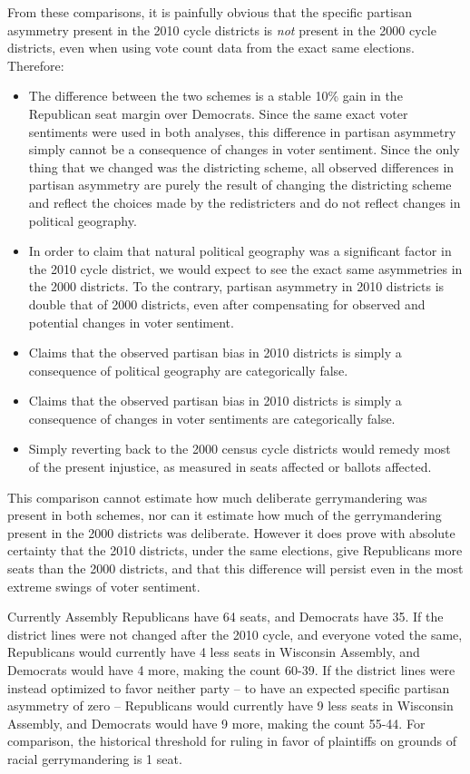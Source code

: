 \documentclass[preprint,12pt]{article}
\begin{document}
From these comparisons, it is painfully obvious that the specific partisan asymmetry present in the 2010 cycle districts is \emph{not} present in the 2000 cycle districts, even when using vote count data from the exact same elections.  Therefore:
\begin{itemize}

\item The difference between the two schemes is a stable 10\% gain in the Republican seat margin over Democrats.
Since the same exact voter sentiments were used in both analyses, this difference in partisan asymmetry simply cannot be a consequence of changes in voter sentiment.  
Since the only thing that we changed was the districting scheme, all observed differences in partisan asymmetry are purely the result of changing the districting scheme and reflect the choices made by the redistricters and do not reflect changes in political geography.
\item In order to claim that natural political geography was a significant factor in the 2010 cycle district, we would expect to see the exact same asymmetries in the 2000 districts.
To the contrary, partisan asymmetry in 2010 districts is double that of 2000 districts, even after compensating for observed and potential changes in voter sentiment.
\item Claims that the observed partisan bias in 2010 districts is simply a consequence of political geography are categorically false.
\item Claims that the observed partisan bias in 2010 districts is simply a consequence of changes in voter sentiments are categorically false.
\item Simply reverting back to the 2000 census cycle districts would remedy most of the present injustice, as measured in seats affected or ballots affected.
\end{itemize}

This comparison cannot estimate how much deliberate gerrymandering was present in both schemes, nor can it estimate how much of the gerrymandering present in the 2000 districts was deliberate.
However it does prove with absolute certainty that the 2010 districts, under the same elections, give Republicans more seats than the 2000 districts, and that this difference will persist even in the most extreme swings of voter sentiment.

Currently Assembly Republicans have 64 seats, and Democrats have 35.
If the district lines were not changed after the 2010 cycle, and everyone voted the same, 
Republicans would currently have 4 less seats in Wisconsin Assembly, and Democrats would have 4 more, making the count 60-39.
If the district lines were instead optimized to favor neither party -- to have an expected specific partisan asymmetry of zero -- 
Republicans would currently have 9 less seats in Wisconsin Assembly, and Democrats would have 9 more, making the count 55-44.
For comparison, the historical threshold for ruling in favor of plaintiffs on grounds of racial gerrymandering is 1 seat.
\end{document}
